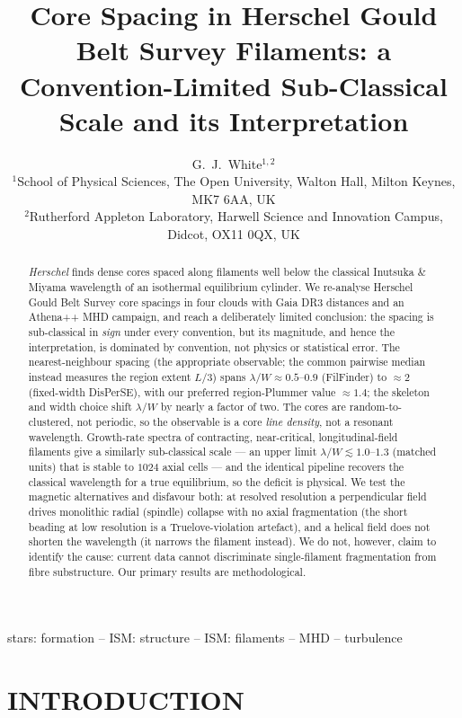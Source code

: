 \documentclass[usenatbib,twoside,twocolumn]{mnras}
\title{Core Spacing in Herschel Gould Belt Survey Filaments: a Convention-Limited Sub-Classical Scale and its Interpretation}
\author[G.~J.~White]{G.~J.~White$^{1,2}$\\
$^{1}$School of Physical Sciences, The Open University, Walton Hall, Milton Keynes, MK7 6AA, UK\\
$^{2}$Rutherford Appleton Laboratory, Harwell Science and Innovation Campus, Didcot, OX11 0QX, UK}
\begin{document}
\maketitle

\begin{abstract}
\textit{Herschel} finds dense cores spaced along filaments well below the classical Inutsuka \& Miyama wavelength of an isothermal equilibrium cylinder. We re-analyse Herschel Gould Belt Survey core spacings in four clouds with Gaia DR3 distances and an Athena++ MHD campaign, and reach a deliberately limited conclusion: the spacing is sub-classical in \emph{sign} under every convention, but its magnitude, and hence the interpretation, is dominated by convention, not physics or statistical error. The nearest-neighbour spacing (the appropriate observable; the common pairwise median instead measures the region extent $L/3$) spans $\lambda/W\approx0.5$--$0.9$ (FilFinder) to $\approx2$ (fixed-width DisPerSE), with our preferred region-Plummer value $\approx1.4$; the skeleton and width choice shift $\lambda/W$ by nearly a factor of two. The cores are random-to-clustered, not periodic, so the observable is a core \emph{line density}, not a resonant wavelength. Growth-rate spectra of contracting, near-critical, longitudinal-field filaments give a similarly sub-classical scale --- an upper limit $\lambda/W\lesssim1.0$--$1.3$ (matched units) that is stable to $1024$ axial cells --- and the identical pipeline recovers the classical wavelength for a true equilibrium, so the deficit is physical. We test the magnetic alternatives and disfavour both: at resolved resolution a perpendicular field drives monolithic radial (spindle) collapse with no axial fragmentation (the short beading at low resolution is a Truelove-violation artefact), and a helical field does not shorten the wavelength (it narrows the filament instead). We do not, however, claim to identify the cause: current data cannot discriminate single-filament fragmentation from fibre substructure. Our primary results are methodological.
\end{abstract}


\begin{keywords}
stars: formation -- ISM: structure -- ISM: filaments -- MHD -- turbulence
\end{keywords}

\section{INTRODUCTION}
\end{document}

